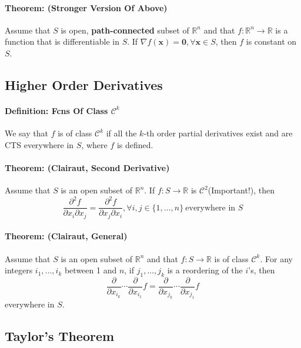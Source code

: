 \documentclass[11pt]{article}
\newcommand{\real}{\mathbb{R}}
\newcommand{\vx}{\mathbf{x}}
\newcommand{\vzero}{\mathbf{0}}
\begin{document}
\paragraph{Theorem: (Stronger Version Of Above)} Assume that $S$ is open, \textbf{path-connected} subset of $\real^n$ and that $f:\real^n \to \real$ is a function that is differentiable in $S$. If $\nabla f(\vx) = \vzero, \forall \vx\in S$, then $f$ is constant on $S$.

\subsection{Higher Order Derivatives}
\paragraph{Definition: Fcns Of Class $\mathcal{C}^k$} We say that $f$ is of class $\mathcal{C}^k$ if all the $k$-th order partial derivatives exist and are CTS everywhere in $S$, where $f$ is defined.

\paragraph{Theorem: (Clairaut, Second Derivative)} Assume that $S$ is an open subset of $\real^n$. If $f:S\to \real$ is $\mathcal{C}^2$(Important!), then
\begin{equation*}
    \frac{\partial^2f}{\partial x_i \partial x_j} = \frac{\partial^2f}{\partial x_j \partial x_i}, \forall i, j \in \{ 1,...,n \}~\text{everywhere in $S$}
\end{equation*}

\paragraph{Theorem: (Clairaut, General)} Assume that $S$ is an open subset of $\real^n$ and that $f:S\to \real$ is of class $\mathcal{C}^k$. For any integers $i_1,...,i_k$ between 1 and $n$, if $j_1,...,j_k$ is a reordering of the $i$'s, then
\begin{equation*}
    \frac{\partial}{\partial x_{i_k} }\cdots\frac{\partial}{\partial x_{i_1} }f= \frac{\partial}{\partial x_{j_k} }\cdots\frac{\partial}{\partial x_{j_1} }f
\end{equation*}
everywhere in $S$.

\subsection{Taylor's Theorem}
\end{document}
